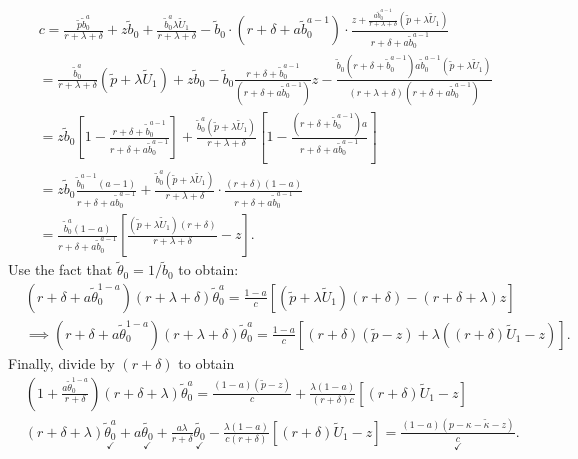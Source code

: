 \documentclass[12pt]{article} %
\theoremstyle{definition}
\begin{document}
\begin{appendix}
\begin{align*}
& c =  \frac{\tilde{p}\tilde{b}_0^a}{r+\lambda+\delta} + z\tilde{b}_0 + \frac{\tilde{b}_0^a \lambda \tilde{U}_1}{r+\lambda+\delta} - \tilde{b}_0 \cdot (r+\delta+a\tilde{b}_0^{a-1}) \cdot \frac{z + \frac{a \tilde{b}_0^{a-1}}{r+\lambda+\delta} (\tilde{p}+\lambda \tilde{U}_1)}{r+\delta+a\tilde{b}_0^{a-1}}\\ 
& =  \frac{\tilde{b}_0^a}{r+\lambda+\delta} (\tilde{p}+\lambda \tilde{U}_1) + z\tilde{b}_0 - \tilde{b}_0 \frac{r+\delta+\tilde{b}_0^{a-1}}{(r+\delta+a\tilde{b}_0^{a-1})}z - \frac{\tilde{b}_0(r+\delta+\tilde{b}_0^{a-1})a\tilde{b}_0^{a-1}(\tilde{p}+\lambda \tilde{U}_1)}{(r+\lambda+\delta)(r+\delta+a\tilde{b}_0^{a-1})} \\ 
& = z\tilde{b}_0 \left[1 - \frac{r+\delta+\tilde{b}_0^{a-1}}{r+\delta+a\tilde{b}_0^{a-1}}\right] + \frac{\tilde{b}_0^a(\tilde{p}+\lambda \tilde{U}_1)}{r+\lambda+\delta}\left[1 - \frac{(r+\delta+\tilde{b}_0^{a-1})a}{r+\delta+a\tilde{b}_0^{a-1}}\right] \\ 
& = z\tilde{b}_0 \frac{\tilde{b}_0^{a-1}(a-1)}{r+\delta+a\tilde{b}_0^{a-1}} + \frac{\tilde{b}_0^a(\tilde{p}+\lambda \tilde{U}_1)}{r+\lambda+\delta} \cdot \frac{(r+\delta)(1-a)}{r+\delta+a\tilde{b}_0^{a-1}} \\
& = \frac{\tilde{b}_0^{a}(1-a)}{r+\delta+a\tilde{b}_0^{a-1}} \left[ \frac{(\tilde{p}+\lambda \tilde{U}_1)(r+\delta)}{r+\lambda+\delta} - z \right].
\end{align*}
Use the fact that $\tilde{\theta}_0 = {1}/{\tilde{b}_0}$ to obtain:
\begin{align*}
& (r+\delta+a\tilde{\theta}_0^{1-a})(r+\lambda+\delta)\tilde{\theta}_0^a = \frac{1-a}{c} [(\tilde{p}+\lambda \tilde{U}_1)(r+\delta) - (r+\delta+\lambda)z] \\
& \implies (r+\delta+a\tilde{\theta}_0^{1-a})(r+\lambda+\delta)\tilde{\theta}_0^a = \frac{1-a}{c} [(r+\delta)(\tilde{p}-z) +\lambda ((r+\delta)\tilde{U}_1-z)] .
\end{align*}
Finally, divide by $(r+\delta)$ to obtain 
\begin{align*}
& (1+\frac{a\tilde{\theta}_0^{1-a}}{r+\delta})(r+\delta+\lambda)\tilde{\theta}_0^a = \frac{(1-a)(\tilde{p}-z)}{c} + \frac{\lambda(1-a)}{(r+\delta)c}[(r+\delta)\tilde{U}_1-z] \\
& (r+\delta+\lambda) \underset{\checkmark}{\tilde{\theta}_0^a} + a \underset{\checkmark}{\tilde{\theta_0}} + \frac{a\lambda}{r+\delta} \underset{\checkmark}{\tilde{\theta_0}} - \frac{\lambda(1-a)}{c(r+\delta)}[(r+\delta)\tilde{U}_1 - z] = \underset{\checkmark}{\frac{(1-a)(p - \kappa - \tilde{\kappa} - z)}{c}}. 

\end{align*}
\end{appendix}
\end{document}
